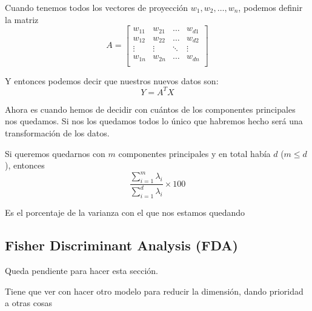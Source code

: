 Cuando tenemos todos los vectores de proyección $w_1,w_2,\dots,w_n$, podemos definir la matriz
\begin{equation*}
  A =
  \begin{bmatrix}
    w_{11} & w_{21} & \dots & w_{d1} \\
    w_{12} & w_{22} & \dots & w_{d2} \\
    \vdots & \vdots & \ddots & \vdots \\
    w_{1n} & w_{2n} & \dots & w_{dn} \\
  \end{bmatrix}
\end{equation*}

Y entonces podemos decir que nuestros nuevos datos son:
\begin{equation*}
  Y = A^TX
\end{equation*}

Ahora es cuando hemos de decidir con cuántos de los componentes principales nos quedamos. Si nos los quedamos todos lo único que habremos hecho será una transformación de los datos.

Si queremos quedarnos con $m$ componentes principales y en total había $d$ ($m \leq d$), entonces
\begin{equation*}
  \frac
  {
    \sum_{i = 1}^{m} \lambda_i
  }
  {
    \sum_{i = 1}^{d} \lambda_i
  }
  \times 100
\end{equation*}

Es el porcentaje de la varianza con el que nos estamos quedando

\subsection{Fisher Discriminant Analysis (FDA)}
Queda pendiente para hacer esta sección.

Tiene que ver con hacer otro modelo para reducir la dimensión, dando prioridad a otras cosas

